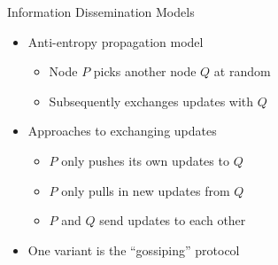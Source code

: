 \begin{note}{Information Dissemination Models}
	\begin{itemize}
		\item Anti-entropy propagation model
		\begin{itemize}
			\item Node $P$ picks another node $Q$ at random
			\item Subsequently exchanges updates with $Q$
		\end{itemize}	
		\item Approaches to exchanging updates
		\begin{itemize}
			\item $P$ only pushes its own updates to $Q$
			\item $P$ only pulls in new updates from $Q$
			\item $P$ and $Q$ send updates to each other
		\end{itemize}
		\item One variant is the ``gossiping'' protocol
	\end{itemize}
\end{note}

